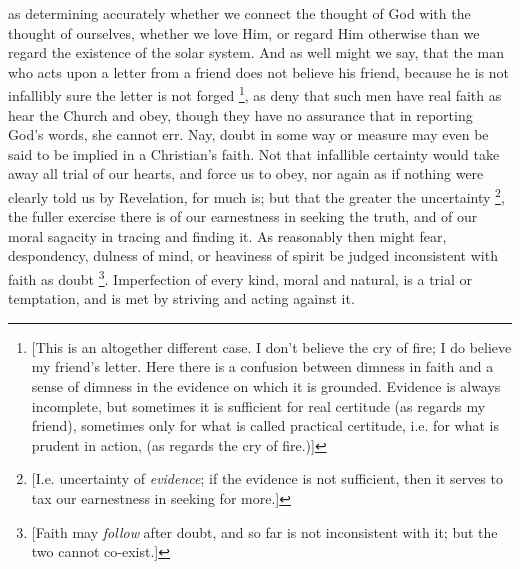 as determining accurately whether we connect the thought of God with
the thought of ourselves, whether we love Him, or regard Him otherwise
than we regard the existence of the solar system. And as well might we
say, that the man who acts upon a letter from a friend does not
believe his friend, because he is not infallibly sure the letter is
not forged \footnote{[This is an altogether different case. I don't
believe the cry of fire; I do believe my friend's letter. Here there
is a confusion between dimness in faith and a sense of dimness in the
evidence on which it is grounded. Evidence is always incomplete, but
sometimes it is sufficient for real certitude (as regards my friend),
sometimes only for what is called practical certitude, i.e. for what
is prudent in action, (as regards the cry of fire.)]}, as deny that
such men have real faith as hear the Church and obey, though they have
no assurance that in reporting God's words, she cannot err. Nay, doubt
in some way or measure may even be said to be implied in a Christian's
faith. Not that infallible certainty would take away all trial of our
hearts, and force us to obey, nor again as if nothing were clearly
told us by Revelation, for much is; but that the greater the
uncertainty \footnote{[I.e. uncertainty of \emph{evidence}; if
the evidence is not sufficient, then it serves to tax our earnestness
in seeking for more.]}, the
fuller exercise there is of our earnestness in seeking the truth, and
of our moral sagacity in tracing and finding it. As reasonably then
might fear, despondency, dulness of mind, or heaviness of spirit be
judged inconsistent with faith as doubt \footnote{[Faith may \emph{follow} after doubt, and
so far is not inconsistent with it; but the two cannot co-exist.]}. Imperfection of every kind, moral and natural, is a trial or
temptation, and is met by striving and acting against it.


